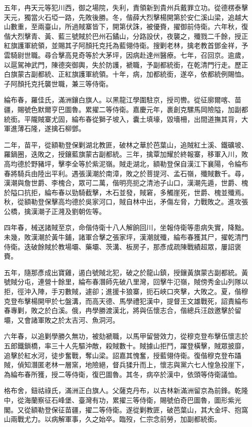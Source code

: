 \begin{pinyinscope}
五年，冉天元等犯川西，御之場院，失利，責領新到貴州兵戴罪立功。從德楞泰擊天元，獨當火石埡一路，先敗後勝。冬，偕薛大烈擊楊開第於安仁溪山梁，追越大山數重，至兩臺山，所過賊寨皆下，開第伏誅，被優賚，擢御前侍衛。六年秋，復偕大烈擊青、黃、藍三號賊於巴州石鐍山，分路設伏，夜襲之，殲戮二千餘，授正紅旗護軍統領，並賜其子阿顏托克托為藍翎侍衛。搜剿老林，擒老教首鄧金祥，予雲騎尉世職。尋合擊高見奇等於大茅坪，因病赴達州醫療。七年，召回京。逾歲，以扈駕神武門，陳德突御輿，失於防護，褫職，予副都統銜，在乾清門行走。歷正白旗蒙古副都統、正紅旗護軍統領。十年，病，加都統銜，遂卒，依都統例賜恤。子阿顏托克托襲世職，兼三等侍衛。

綸布春，羅佳氏，滿洲鑲白旗人。以黑龍江學圍駐京，授司轡。從征廓爾喀、苗疆，賜號色默爾亨巴圖魯。累擢二等侍衛。嘉慶元年，裹創克騾馬岡險隘，加副都統銜。平隴賊寨尤固，綸布春從獅子坡入，囊土填壕，毀墻柵，出間道撫其背，大軍進薄石隆，遂擒石柳鄧。

二年，苗平，從額勒登保剿湖北教匪，破林之華於芭葉山，追賊紅土溪、鐵礦坡、羅鍋圈，迭敗之，授鑲藍旗蒙古副都統。三年，擒覃加耀於終報寨，移軍入川，敗高均德於野豬坪，擊李全等於紫泥嶺。賊走湖北，額勒登保自漢江下襄陽，令綸布春將騎兵由陸出平利。遇張漢潮於南漳，敗之於菩提河、孟石嶺，殲賊數千。尋，漢潮與詹世爵、李槐合，眾可二萬，偕明亮扼之清池子山口，漢潮先遁，世爵、槐於隘口抗拒，綸布春以勁騎截擊，木石並發，賊窘，多觸崖死，世爵、槐並殲焉。秋，從額勒登保擊高均德於吳家河口，賊自林中出，矛傷左脅，力戰敗之。進攻張公橋，擒漢潮子正漋及劉朝佐等。

四年春，械送諸賊至京，命偕侍衛十八人解餉回川，坐報侍衛等患病失實，降黜。未幾，敗漢潮於黃牛鋪，諸軍合擊之張家坪，漢潮就殲，綸布春獲其尸，擢乾清門侍衛。迭破餘賊於教場壩、藥壩、茨溝、板房子，那彥成疏陳戰績超眾，屢詔褒賚。

五年，隨那彥成出寶雞，遏白號賊北犯，破之於龍山鎮，授鑲黃旗蒙古副都統。黃號賊分屯，連營十餘里，綸布春潛師先破八里灣，回擊牛氾嶺，賊傍秀金山列隊以拒，徑沖入陣，手刃數賊，遽卻；進援卡狼寨，扼石峽口夾擊，大敗之。夏，偕穆克登布擊楊開甲於七盤溝，而高天德、馬學禮犯漢中，提督王文雄戰死，詔責綸布春專剿，敗之於白溪。俄，冉學勝渡漢北，將與伍懷志合，偕總兵汪啟邀擊於留壩，又會諸軍敗之於太吉河、魚洞河。

六年春，以追剿學勝久無功，被劾褫職，以馬甲留營效力，從穆克登布擊伍懷志於五郎鐵鎖橋，率三十人先驅沖敵，殺賊數十。賊據山拒鬥，躍登橫擊，賊眾披靡，追擊於紅水河，徒步奮戰，奪山梁。詔嘉其愧奮，授藍翎侍衛。復偕穆克登布躡賊，偵知潛匿老林一層窯，地險絕，督兵猱升而上，懷志與黨六七人惶急投崖下，為綸布春所獲，授二等侍衛，復巴圖魯。其冬，病卒於漢中，依頭等侍衛議恤。

格布舍，鈕祜祿氏，滿洲正白旗人。父薩克丹布，以吉林新滿洲留京為前鋒。乾隆中，從海蘭察征石峰堡、臺灣有功，累擢三等侍衛，賜號伯奇巴圖魯，圖形紫光閣。又從額勒登保征苗疆，擢二等侍衛。遂從剿教匪，破芭葉山，其大金坪、抱窩山兩戰尤力。以病解軍事，久之始卒。臨歿，仁宗念前勞，加副都統銜。


\end{pinyinscope}
